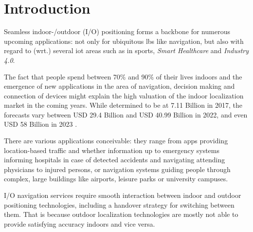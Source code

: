 \chapter{Introduction}

Seamless indoor-/outdoor (I/O) positioning forms a backbone for numerous upcoming applications: not only for ubiquitous \ac{lbs} like navigation, but also with regard to (wrt.) several \ac{iot} areas such as in sports, \textit{Smart Healthcare} and \textit{Industry 4.0}.
 
The fact that people spend between 70\% and 90\% of their lives indoors \cite{navIndoors} and the emergence of new applications in the area of navigation, decision making and connection of devices might explain the high valuation of the indoor localization market in the coming years. While determined to be at 7.11 Billion in 2017, the forecasts vary between USD 29.4 Billion \cite{indoorMarket2022} %
and USD 40.99 Billion \cite{indoorMarket22markets} in 2022, and even USD 58 Billion in 2023 \cite{indoorMarket2023}. %

There are various applications conceivable: they range from apps providing location-based traffic and whether information up to emergency systems informing hospitals in case of detected accidents and navigating attending physicians to injured persons, or navigation systems guiding people through complex, large buildings like airports, leisure parks or university campuses.

I/O navigation services require smooth interaction between indoor and outdoor positioning technologies, including a handover strategy for switching between them. That is because outdoor localization technologies are mostly not able to provide satisfying accuracy indoors and vice versa.

